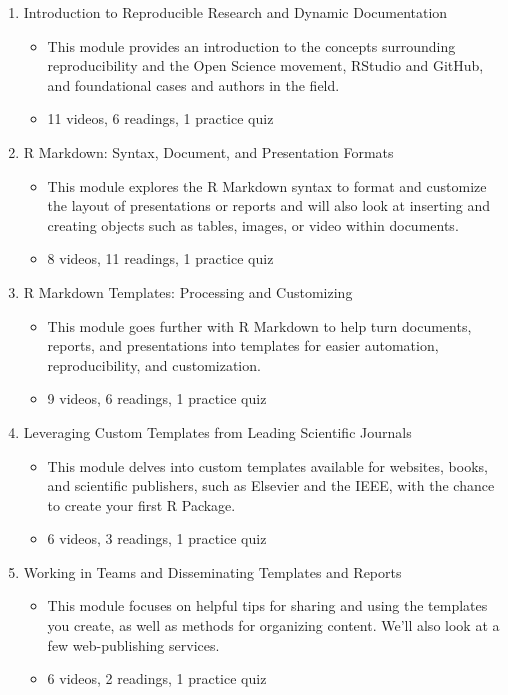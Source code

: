 \documentclass[]{book}
\providecommand{\tightlist}{%
  \setlength{\itemsep}{0pt}\setlength{\parskip}{0pt}}
\theoremstyle{definition}
\theoremstyle{definition}
\theoremstyle{definition}
\theoremstyle{remark}
\begin{document}
\begin{enumerate}
\def\labelenumi{\arabic{enumi}.}
\tightlist
\item
  Introduction to Reproducible Research and Dynamic Documentation

  \begin{itemize}
  \tightlist
  \item
    This module provides an introduction to the concepts surrounding
    reproducibility and the Open Science movement, RStudio and GitHub,
    and foundational cases and authors in the field.
  \item
    11 videos, 6 readings, 1 practice quiz
  \end{itemize}
\item
  R Markdown: Syntax, Document, and Presentation Formats

  \begin{itemize}
  \tightlist
  \item
    This module explores the R Markdown syntax to format and customize
    the layout of presentations or reports and will also look at
    inserting and creating objects such as tables, images, or video
    within documents.
  \item
    8 videos, 11 readings, 1 practice quiz
  \end{itemize}
\item
  R Markdown Templates: Processing and Customizing

  \begin{itemize}
  \tightlist
  \item
    This module goes further with R Markdown to help turn documents,
    reports, and presentations into templates for easier automation,
    reproducibility, and customization.
  \item
    9 videos, 6 readings, 1 practice quiz
  \end{itemize}
\item
  Leveraging Custom Templates from Leading Scientific Journals

  \begin{itemize}
  \tightlist
  \item
    This module delves into custom templates available for websites,
    books, and scientific publishers, such as Elsevier and the IEEE,
    with the chance to create your first R Package.
  \item
    6 videos, 3 readings, 1 practice quiz
  \end{itemize}
\item
  Working in Teams and Disseminating Templates and Reports

  \begin{itemize}
  \tightlist
  \item
    This module focuses on helpful tips for sharing and using the
    templates you create, as well as methods for organizing content.
    We'll also look at a few web-publishing services.
  \item
    6 videos, 2 readings, 1 practice quiz
  \end{itemize}
\end{enumerate}
\end{document}
